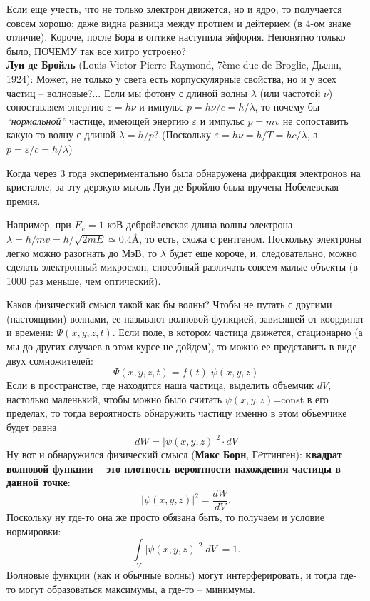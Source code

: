 \documentclass[12pt,epsfig,color,russian]{article}
\begin{document}
Если еще учесть, что не только электрон движется, но и ядро, то получается совсем хорошо: даже видна разница между протием и дейтерием (в 4-ом знаке отличие). Короче, после Бора в оптике наступила эйфория. Непонятно только было, ПОЧЕМУ так все хитро устроено? \\[5mm]
{\bf Луи де Бройль} (Louis-Victor-Pierre-Raymond, 7\`{e}me duc de Broglie, Дьепп, 1924):  Может, не только у света есть корпускулярные свойства, но и у всех частиц -- волновые?...  Если мы фотону с длиной волны $\lambda$ (или частотой $\nu$) сопоставляем энергию $\varepsilon=h\nu$ и импульс $p=h\nu/c=h/\lambda$, то почему бы {\em``нормальной''} частице, имеющей энергию $\varepsilon$ и импульс $p=mv$ не сопоставить какую-то волну с длиной $\lambda=h/p$? (Поскольку $\varepsilon=h\nu=h/T=hc/\lambda$, а $p=\varepsilon/c=h/\lambda$)

Когда через 3 года экспериментально была обнаружена дифракция электронов на кристалле, за эту дерзкую мысль Луи де Бройлю была вручена Нобелевская премия.

Например, при $E_e=1$ кэВ дебройлевская длина волны электрона $\lambda=h/mv=h/\sqrt{2mE}\simeq0.4${\AA}, то есть, схожа с рентгеном. Поскольку электроны легко можно разогнать до МэВ, то $\lambda$ будет еще короче, и, следовательно, можно сделать электронный микроскоп, способный различать совсем малые объекты (в 1000 раз меньше, чем оптический).

Каков физический смысл такой как бы волны? Чтобы не путать с другими (настоящими) волнами, ее называют волновой функцией, зависящей от координат и времени: $\Psi(x,y,z,t)$. Если поле, в котором частица движется, стационарно (а мы до других случаев в этом курсе не дойдем), то можно ее представить в виде двух сомножителей:
\begin{displaymath}
\Psi(x,y,z,t)=f(t)\;\psi(x,y,z)
\end{displaymath}
Если в пространстве, где находится наша частица, выделить объемчик $dV$, настолько маленький, чтобы можно было считать $\psi(x,y,z)$=const в его пределах, то тогда вероятность обнаружить частицу именно в этом объемчике будет равна
\begin{displaymath}
dW=|\psi(x,y,z)|^2\cdot dV
\end{displaymath}
Ну вот и обнаружился физический смысл ({\bf Макс Борн}, Г\"{e}ттинген):  {\bf квадрат волновой функции -- это плотность вероятности нахождения частицы в данной точке}:
\begin{displaymath}
|\psi(x,y,z)|^2=\frac{dW}{dV}.
\end{displaymath}
Поскольку ну где-то она же просто обязана быть, то получаем и условие нормировки:
\begin{displaymath}
\int\limits_V|\psi(x,y,z)|^2\;dV\;=1.
\end{displaymath}
Волновые функции (как и обычные волны) могут интерферировать, и тогда где-то могут образоваться максимумы, а где-то -- минимумы.
\end{document}
